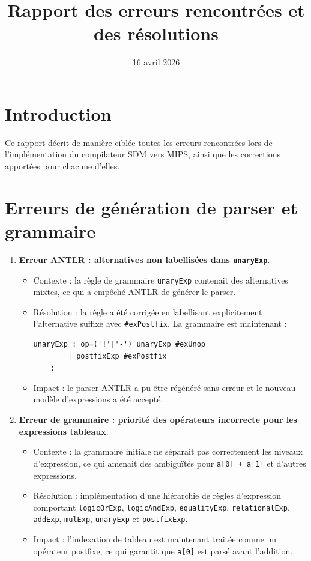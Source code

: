 \documentclass[a4paper,11pt]{article}
\title{Rapport des erreurs rencontrées et des résolutions}
\author{}
\date{16 avril 2026}
\begin{document}
\maketitle

\section*{Introduction}
Ce rapport décrit de manière ciblée toutes les erreurs rencontrées lors de l'implémentation du compilateur SDM vers MIPS, ainsi que les corrections apportées pour chacune d'elles.

\section{Erreurs de génération de parser et grammaire}
\begin{enumerate}[label=\arabic*)]
  \item \textbf{Erreur ANTLR : alternatives non labellisées dans \texttt{unaryExp}}.
  \begin{itemize}
    \item Contexte : la règle de grammaire \texttt{unaryExp} contenait des alternatives mixtes, ce qui a empêché ANTLR de générer le parser.
    \item Résolution : la règle a été corrigée en labellisant explicitement l'alternative suffixe avec \texttt{#exPostfix}. La grammaire est maintenant :
    \begin{verbatim}
unaryExp : op=('!'|'-') unaryExp #exUnop
        | postfixExp #exPostfix
    ;
    \end{verbatim}
    \item Impact : le parser ANTLR a pu être régénéré sans erreur et le nouveau modèle d'expressions a été accepté.
  \end{itemize}

  \item \textbf{Erreur de grammaire : priorité des opérateurs incorrecte pour les expressions tableaux}.
  \begin{itemize}
    \item Contexte : la grammaire initiale ne séparait pas correctement les niveaux d'expression, ce qui amenait des ambiguïtés pour \texttt{a[0] + a[1]} et d'autres expressions.
    \item Résolution : implémentation d'une hiérarchie de règles d'expression comportant \texttt{logicOrExp}, \texttt{logicAndExp}, \texttt{equalityExp}, \texttt{relationalExp}, \texttt{addExp}, \texttt{mulExp}, \texttt{unaryExp} et \texttt{postfixExp}.
    \item Impact : l'indexation de tableau est maintenant traitée comme un opérateur postfixe, ce qui garantit que \texttt{a[0]} est parsé avant l'addition.
  \end{itemize}
\end{enumerate}
\end{document}
